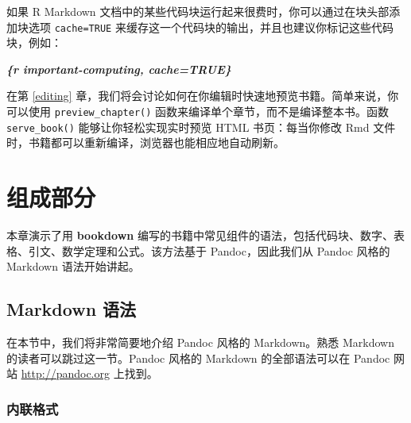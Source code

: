 \documentclass[
  12pt,
]{krantz}
\newenvironment{Shaded}{\begin{snugshade}}{\end{snugshade}}
\newcommand{\InformationTok}[1]{\textcolor[rgb]{0.56,0.35,0.01}{\textbf{\textit{#1}}}}
\theoremstyle{definition}
\theoremstyle{definition}
\theoremstyle{definition}
\theoremstyle{definition}
\theoremstyle{remark}
\begin{document}
如果 R Markdown 文档中的某些代码块运行起来很费时，你可以通过在块头部添加块选项 \texttt{cache=TRUE} 来缓存这一个代码块的输出，并且也建议你标记这些代码块，例如：

\begin{Shaded}
\begin{Highlighting}[]
\InformationTok{\textasciigrave{}\textasciigrave{}\textasciigrave{}\{r important{-}computing, cache=TRUE\}}
\end{Highlighting}
\end{Shaded}

在第 \ref{editing} 章，我们将会讨论如何在你编辑时快速地预览书籍。简单来说，你可以使用 \texttt{preview\_chapter()} 函数来编译单个章节，而不是编译整本书。函数 \texttt{serve\_book()} 能够让你轻松实现实时预览 HTML 书页：每当你修改 Rmd 文件时，书籍都可以重新编译，浏览器也能相应地自动刷新。

\chapter{组成部分}\label{components}

本章演示了用 \textbf{bookdown} 编写的书籍中常见组件的语法，包括代码块、数字、表格、引文、数学定理和公式。该方法基于 Pandoc，因此我们从 Pandoc 风格的 Markdown 语法开始讲起。

\section{Markdown 语法}\label{markdown-syntax}

在本节中，我们将非常简要地介绍 Pandoc 风格的 Markdown。熟悉 Markdown 的读者可以跳过这一节。Pandoc 风格的 Markdown 的全部语法可以在 Pandoc 网站 \url{http://pandoc.org} 上找到。

\subsection{内联格式}\label{ux5185ux8054ux683cux5f0f}
\end{document}
